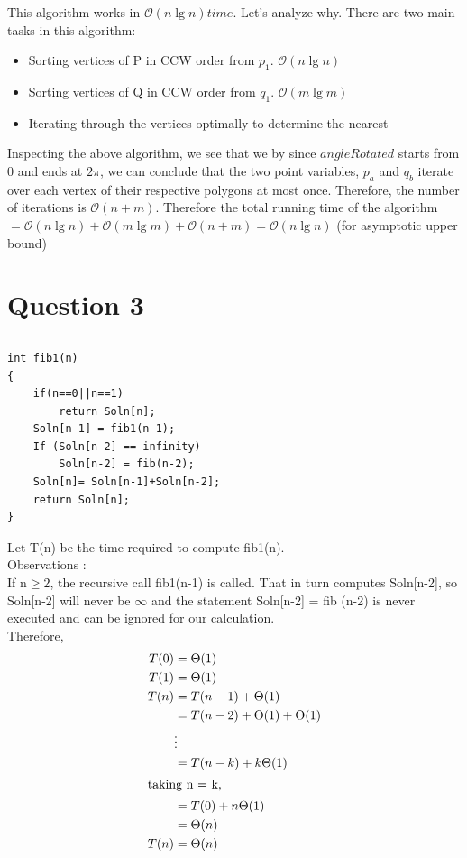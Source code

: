\documentclass{article}
\begin{document}
This algorithm works in $\mathcal{O}(n \lg n) time$. Let's analyze why. There are two main tasks in this algorithm:
\begin{itemize}
  \item Sorting vertices of P in CCW order from $p_1$. $\mathcal{O}(n \lg n)$
  \item Sorting vertices of Q in CCW order from $q_1$. $\mathcal{O}(m \lg m)$  
  \item Iterating through the vertices optimally to determine the nearest
\end{itemize}
Inspecting the above algorithm, we see that we by since $angleRotated$ starts from 0 and ends at $2\pi$, we can conclude that the two point variables, $p_a$ and $q_b$ iterate over each vertex of their respective polygons at most once. Therefore, the number of iterations is $\mathcal{O}(n+m)$.
\newline
Therefore the total running time of the algorithm $= \mathcal{O}(n \lg n) + \mathcal{O}(m \lg m) + \mathcal{O}(n+m) = \mathcal{O}(n \lg n)$ (for asymptotic upper bound)

\newpage
\section{Question 3}
\subsection{}
\begin{lstlisting}
int fib1(n)
{
	if(n==0||n==1) 
		return Soln[n];
	Soln[n-1] = fib1(n-1);
	If (Soln[n-2] == infinity) 
		Soln[n-2] = fib(n-2); 
	Soln[n]= Soln[n-1]+Soln[n-2];
	return Soln[n];
}
\end{lstlisting}

Let T(n) be the time required to compute fib1(n). \\
Observations : \\
If n$\geq 2$, the recursive call fib1(n-1) is called. That in turn computes Soln[n-2], so Soln[n-2] will never be $\infty$ and the statement Soln[n-2] = fib (n-2) is never executed and can be ignored for our calculation.\\

Therefore, 
\begin{align*}
T(0) & = \Theta(1) \\
T(1) & = \Theta(1) \\
T(n) & = T(n-1) + \Theta(1) \\
& = T(n-2) + \Theta(1) + \Theta(1) \\
& \vdots \\
& = T(n-k) + k\Theta(1) \\
\intertext{taking n = k,}
& = T(0) + n\Theta(1) \\
& = \Theta(n) \\
T(n) & = \Theta(n)\\
\end{align*}
\end{document}
